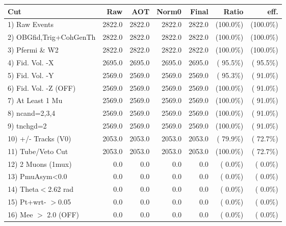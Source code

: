  \begin{table}[h!]\centering
 \begin{tabular}{||l||r|r|r|r|r|r||}
 \hline
 \hline
 Cut & Raw & AOT & Norm0 & Final & Ratio & eff.       \\
 \hline
  1) Raw Events           &       2822.0 &       2822.0 &       2822.0 &       2822.0 & (100.0\%) & (100.0\%) \\
  2) OBGfid,Trig+CohGenTh &       2822.0 &       2822.0 &       2822.0 &       2822.0 & (100.0\%) & (100.0\%) \\
  3) Pfermi \& W2         &       2822.0 &       2822.0 &       2822.0 &       2822.0 & (100.0\%) & (100.0\%) \\
  4) Fid. Vol. -X         &       2695.0 &       2695.0 &       2695.0 &       2695.0 & ( 95.5\%) & ( 95.5\%) \\
  5) Fid. Vol. -Y         &       2569.0 &       2569.0 &       2569.0 &       2569.0 & ( 95.3\%) & ( 91.0\%) \\
  6) Fid. Vol. -Z (OFF)   &       2569.0 &       2569.0 &       2569.0 &       2569.0 & (100.0\%) & ( 91.0\%) \\
  7) At Least 1 Mu        &       2569.0 &       2569.0 &       2569.0 &       2569.0 & (100.0\%) & ( 91.0\%) \\
  8) ncand=2,3,4          &       2569.0 &       2569.0 &       2569.0 &       2569.0 & (100.0\%) & ( 91.0\%) \\
  9) tnchgd=2             &       2569.0 &       2569.0 &       2569.0 &       2569.0 & (100.0\%) & ( 91.0\%) \\
 10) +/- Tracks (V0)      &       2053.0 &       2053.0 &       2053.0 &       2053.0 & ( 79.9\%) & ( 72.7\%) \\
 11) Tube/Veto Cut        &       2053.0 &       2053.0 &       2053.0 &       2053.0 & (100.0\%) & ( 72.7\%) \\
 12) 2 Muons (1mux)       &          0.0 &          0.0 &          0.0 &          0.0 & (  0.0\%) & (  0.0\%) \\
 13) PmuAsym<0.0          &          0.0 &          0.0 &          0.0 &          0.0 & (  0.0\%) & (  0.0\%) \\
 14) Theta$<$2.62 rad     &          0.0 &          0.0 &          0.0 &          0.0 & (  0.0\%) & (  0.0\%) \\
 15) Pt+wrt- $>$0.05      &          0.0 &          0.0 &          0.0 &          0.0 & (  0.0\%) & (  0.0\%) \\
 16) Mee $>$ 2.0  (OFF)   &          0.0 &          0.0 &          0.0 &          0.0 & (  0.0\%) & (  0.0\%) \\

\end{tabular}
\end{table}
